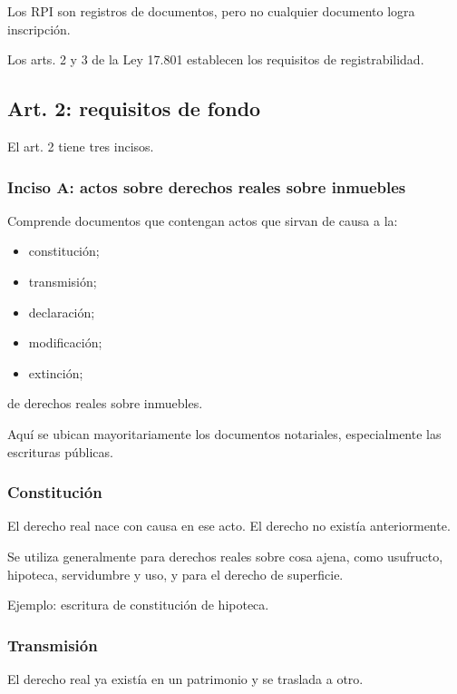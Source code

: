 \documentclass[12pt]{book}
\begin{document}
Los RPI son registros de documentos, pero no cualquier documento logra inscripci\'on.

Los arts. 2 y 3 de la Ley 17.801 establecen los requisitos de registrabilidad.

\subsection{Art. 2: requisitos de fondo}

El art. 2 tiene tres incisos.

\subsubsection{Inciso A: actos sobre derechos reales sobre inmuebles}

Comprende documentos que contengan actos que sirvan de causa a la:

\begin{itemize}
    \item constituci\'on;
    \item transmisi\'on;
    \item declaraci\'on;
    \item modificaci\'on;
    \item extinci\'on;
\end{itemize}

de derechos reales sobre inmuebles.

Aqu\'i se ubican mayoritariamente los documentos notariales, especialmente las escrituras p\'ublicas.

\subsubsection{Constituci\'on}

El derecho real nace con causa en ese acto. El derecho no exist\'ia anteriormente.

Se utiliza generalmente para derechos reales sobre cosa ajena, como usufructo, hipoteca, servidumbre y uso, y para el derecho de superficie.

Ejemplo: escritura de constituci\'on de hipoteca.

\subsubsection{Transmisi\'on}

El derecho real ya exist\'ia en un patrimonio y se traslada a otro.
\end{document}
